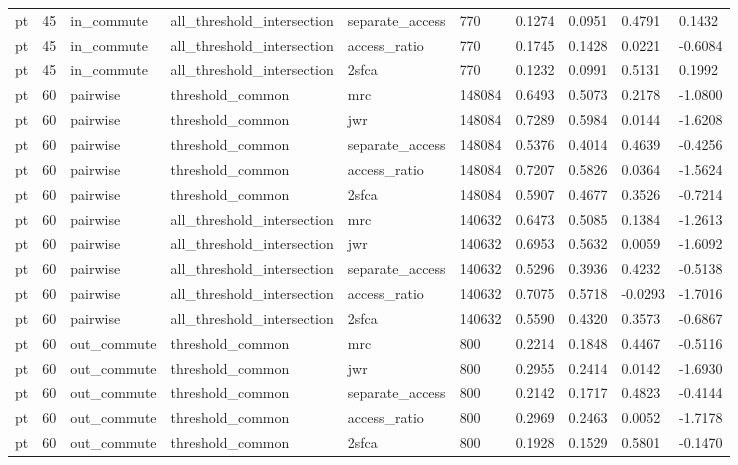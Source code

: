 \begin{table}[htbp]
\begin{tabular}{llllllllll}
pt & 45 & in\_commute & all\_threshold\_intersection & separate\_access & 770 & 0.1274 & 0.0951 & 0.4791 & 0.1432 \\
pt & 45 & in\_commute & all\_threshold\_intersection & access\_ratio & 770 & 0.1745 & 0.1428 & 0.0221 & -0.6084 \\
pt & 45 & in\_commute & all\_threshold\_intersection & 2sfca & 770 & 0.1232 & 0.0991 & 0.5131 & 0.1992 \\
pt & 60 & pairwise & threshold\_common & mrc & 148084 & 0.6493 & 0.5073 & 0.2178 & -1.0800 \\
pt & 60 & pairwise & threshold\_common & jwr & 148084 & 0.7289 & 0.5984 & 0.0144 & -1.6208 \\
pt & 60 & pairwise & threshold\_common & separate\_access & 148084 & 0.5376 & 0.4014 & 0.4639 & -0.4256 \\
pt & 60 & pairwise & threshold\_common & access\_ratio & 148084 & 0.7207 & 0.5826 & 0.0364 & -1.5624 \\
pt & 60 & pairwise & threshold\_common & 2sfca & 148084 & 0.5907 & 0.4677 & 0.3526 & -0.7214 \\
pt & 60 & pairwise & all\_threshold\_intersection & mrc & 140632 & 0.6473 & 0.5085 & 0.1384 & -1.2613 \\
pt & 60 & pairwise & all\_threshold\_intersection & jwr & 140632 & 0.6953 & 0.5632 & 0.0059 & -1.6092 \\
pt & 60 & pairwise & all\_threshold\_intersection & separate\_access & 140632 & 0.5296 & 0.3936 & 0.4232 & -0.5138 \\
pt & 60 & pairwise & all\_threshold\_intersection & access\_ratio & 140632 & 0.7075 & 0.5718 & -0.0293 & -1.7016 \\
pt & 60 & pairwise & all\_threshold\_intersection & 2sfca & 140632 & 0.5590 & 0.4320 & 0.3573 & -0.6867 \\
pt & 60 & out\_commute & threshold\_common & mrc & 800 & 0.2214 & 0.1848 & 0.4467 & -0.5116 \\
pt & 60 & out\_commute & threshold\_common & jwr & 800 & 0.2955 & 0.2414 & 0.0142 & -1.6930 \\
pt & 60 & out\_commute & threshold\_common & separate\_access & 800 & 0.2142 & 0.1717 & 0.4823 & -0.4144 \\
pt & 60 & out\_commute & threshold\_common & access\_ratio & 800 & 0.2969 & 0.2463 & 0.0052 & -1.7178 \\
pt & 60 & out\_commute & threshold\_common & 2sfca & 800 & 0.1928 & 0.1529 & 0.5801 & -0.1470 \\

\end{tabular}
\end{table}
